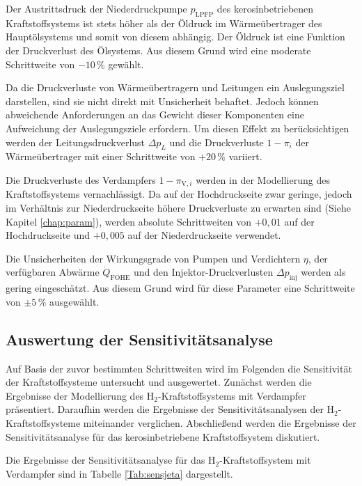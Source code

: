 Der Austrittsdruck der Niederdruckpumpe $p_\mathrm{LPFP}$ des kerosinbetriebenen Kraftstoffsystems ist stets höher als der Öldruck im Wärmeübertrager des Hauptölsystems und somit von diesem abhängig. Der Öldruck ist eine Funktion der Druckverlust des Ölsystems. Aus diesem Grund wird eine moderate Schrittweite von $-10\,\%$ gewählt.

Da die Druckverluste von Wärmeübertragern und Leitungen ein Auslegungsziel darstellen, sind sie nicht direkt mit Unsicherheit behaftet. Jedoch können abweichende Anforderungen an das Gewicht dieser Komponenten eine Aufweichung der Auslegungsziele erfordern. Um diesen Effekt zu berücksichtigen werden der Leitungsdruckverlust $\Delta p_L$ und die Druckverluste $1-\pi_i$ der Wärmeübertrager mit einer Schrittweite von $+20\,\%$ variiert. 

Die Druckverluste des Verdampfers $1-\pi_{\mathrm{V}, i}$ werden in der Modellierung des Kraftstoffsystems vernachlässigt. Da auf der Hochdruckseite zwar geringe, jedoch im Verhältnis zur Niederdruckseite höhere Druckverluste zu erwarten sind (Siehe Kapitel \ref{chap:param}), werden absolute Schrittweiten von $+0,01$ auf der Hochdruckseite und $+0,005$ auf der Niederdruckseite verwendet. 

Die Unsicherheiten der Wirkungsgrade von Pumpen und Verdichtern $\eta$, der verfügbaren Abwärme $\dot{Q}_\mathrm{FOHE}$  und den Injektor-Druckverlusten $\Delta p_\mathrm{inj}$ werden als gering eingeschätzt. Aus diesem Grund wird für diese Parameter eine Schrittweite von $\pm 5\,\%$ ausgewählt.

\subsection{Auswertung der Sensitivitätsanalyse}

Auf Basis der zuvor bestimmten Schrittweiten wird im Folgenden die Sensitivität der Kraftstoffsysteme untersucht und ausgewertet. Zunächst werden die Ergebnisse der Modellierung des H$_2$-Kraftstoffsystems mit Verdampfer präsentiert. Daraufhin werden die Ergebnisse der Sensitivitätsanalysen der H$_2$-Kraftstoffsysteme miteinander verglichen. Abschließend werden die Ergebnisse der Sensitivitätsanalyse für das kerosinbetriebene Kraftstoffsystem diskutiert.

Die Ergebnisse der Sensitivitätsanalyse für das H$_2$-Kraftstoffsystem mit Verdampfer sind in Tabelle \ref{Tab:sensjeta} dargestellt.

